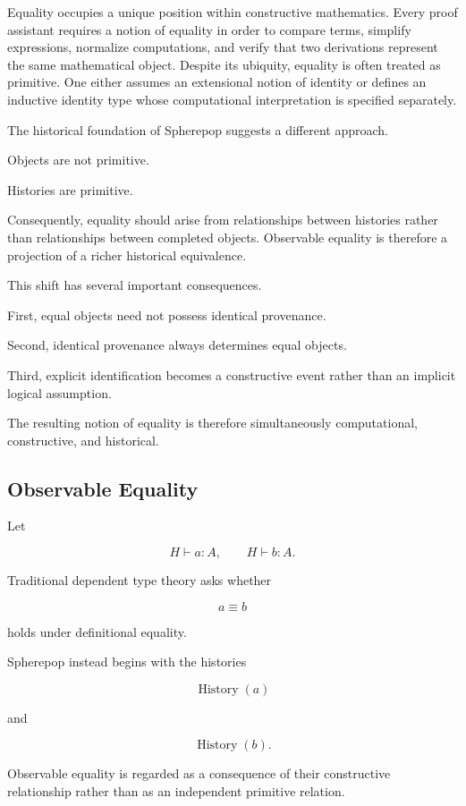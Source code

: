 \documentclass[12pt,oneside]{article}
\theoremstyle{definition}
\theoremstyle{remark}
\DeclareMathOperator{\History}{History}
\begin{document}
Equality occupies a unique position within constructive mathematics. Every
proof assistant requires a notion of equality in order to compare terms,
simplify expressions, normalize computations, and verify that two derivations
represent the same mathematical object. Despite its ubiquity, equality is often
treated as primitive. One either assumes an extensional notion of identity or
defines an inductive identity type whose computational interpretation is
specified separately.

The historical foundation of Spherepop suggests a different approach.

Objects are not primitive.

Histories are primitive.

Consequently, equality should arise from relationships between histories rather
than relationships between completed objects. Observable equality is therefore a
projection of a richer historical equivalence.

This shift has several important consequences.

First, equal objects need not possess identical provenance.

Second, identical provenance always determines equal objects.

Third, explicit identification becomes a constructive event rather than an
implicit logical assumption.

The resulting notion of equality is therefore simultaneously computational,
constructive, and historical.

\subsection{Observable Equality}

Let

\[
H
\vdash
a:A,
\qquad
H
\vdash
b:A.
\]

Traditional dependent type theory asks whether

\[
a
\equiv
b
\]

holds under definitional equality.

Spherepop instead begins with the histories

\[
\History(a)
\]

and

\[
\History(b).
\]

Observable equality is regarded as a consequence of their constructive
relationship rather than as an independent primitive relation.
\end{document}
